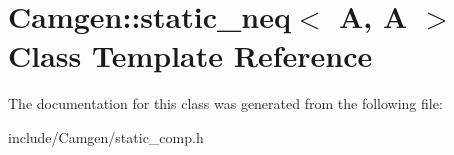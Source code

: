 \hypertarget{a00522}{}\section{Camgen\+:\+:static\+\_\+neq$<$ A, A $>$ Class Template Reference}
\label{a00522}


The documentation for this class was generated from the following file\+:\begin{DoxyCompactItemize}
\item 
include/\+Camgen/static\+\_\+comp.\+h\end{DoxyCompactItemize}
